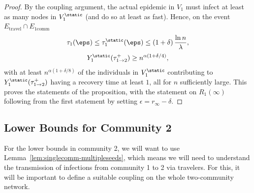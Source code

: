 \documentclass[11pt]{article}
\begin{document}
\begin{proof}
By the coupling argument, the actual epidemic in $V_1$ must infect at least as many nodes in $V_1^{\static}$ (and do so at least as fast). Hence, on the event $E_{\mathrm{travel}} \cap E_{\mathrm{1comm}}$
\[
   \tau_1(\eps)
   \le\tau_1^{\static}(\eps)
   \le
   (1+\delta)\,\frac{\ln n}{\lambda},
\]
\[ Y_1^{\static}(\tau^+_{1\to 2})\geq n^{\alpha(1+\delta/4)},\]
with at least $n^{\alpha(1+\delta/8)}$ of the individuals in $V_1^\static$ contributing to $Y_1^{\static}(\tau^+_{1\to 2} )$ having a recovery time at least $1$,
all for $n$ sufficiently large. This proves the statements of the proposition, with the statement on $R_1(\infty)$ following from the first statement by setting $\epsilon=r_\infty -\delta$.
\end{proof}

\subsection{Lower Bounds for Community 2}
For the lower bounds in community 2, we will want to use Lemma~\ref{lem:singlecomm-multipleseeds}, which means we will need to understand the transmission of infections from community 1 to 2 via travelers.  For this, it will be important to define a suitable coupling on the whole two-community network.  
\end{document}
